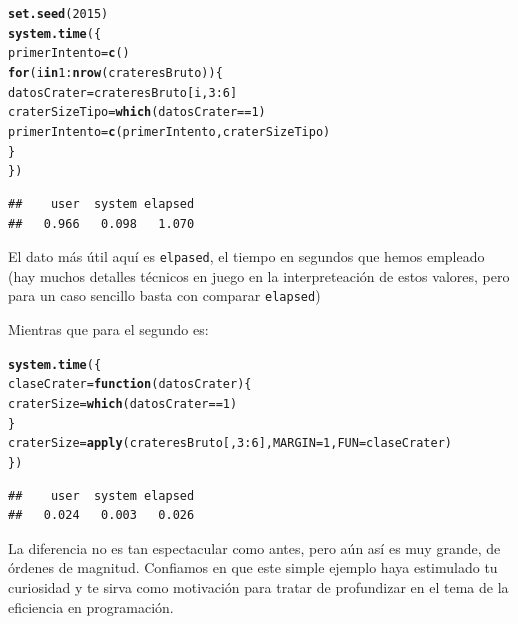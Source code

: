 \documentclass[10pt,a4paper]{article}\usepackage[]{graphicx}\usepackage[]{color}
\makeatletter
\newcommand{\hlnum}[1]{\textcolor[rgb]{0.686,0.059,0.569}{#1}}%
\newcommand{\hlopt}[1]{\textcolor[rgb]{0,0,0}{#1}}%
\newcommand{\hlstd}[1]{\textcolor[rgb]{0.345,0.345,0.345}{#1}}%
\newcommand{\hlkwa}[1]{\textcolor[rgb]{0.161,0.373,0.58}{\textbf{#1}}}%
\newcommand{\hlkwb}[1]{\textcolor[rgb]{0.69,0.353,0.396}{#1}}%
\newcommand{\hlkwc}[1]{\textcolor[rgb]{0.333,0.667,0.333}{#1}}%
\newcommand{\hlkwd}[1]{\textcolor[rgb]{0.737,0.353,0.396}{\textbf{#1}}}%
\newenvironment{kframe}{%
 \def\at@end@of@kframe{}%
 \ifinner\ifhmode%
  \def\at@end@of@kframe{\end{minipage}}%
  \begin{minipage}{\columnwidth}%
 \fi\fi%
 \def\FrameCommand##1{\hskip\@totalleftmargin \hskip-\fboxsep
 \colorbox{shadecolor}{##1}\hskip-\fboxsep
     \hskip-\linewidth \hskip-\@totalleftmargin \hskip\columnwidth}%
 \MakeFramed {\advance\hsize-\width
   \@totalleftmargin\z@ \linewidth\hsize
   \@setminipage}}%
 {\par\unskip\endMakeFramed%
 \at@end@of@kframe}
\newenvironment{knitrout}{}{} %
\makeatother
\begin{document}
\begin{knitrout}
\color{fgcolor}\begin{kframe}
\begin{alltt}
\hlkwd{set.seed}\hlstd{(}\hlnum{2015}\hlstd{)}
\hlkwd{system.time}\hlstd{(\{}
  \hlstd{primerIntento} \hlkwb{=} \hlkwd{c}\hlstd{()}
  \hlkwa{for}\hlstd{(i} \hlkwa{in} \hlnum{1}\hlopt{:}\hlkwd{nrow}\hlstd{(crateresBruto))\{}
    \hlstd{datosCrater} \hlkwb{=} \hlstd{crateresBruto[i,} \hlnum{3}\hlopt{:}\hlnum{6}\hlstd{]}
    \hlstd{craterSizeTipo} \hlkwb{=} \hlkwd{which}\hlstd{(datosCrater} \hlopt{==} \hlnum{1}\hlstd{)}
    \hlstd{primerIntento} \hlkwb{=} \hlkwd{c}\hlstd{(primerIntento, craterSizeTipo)}
  \hlstd{\}}
\hlstd{\})}
\end{alltt}
\begin{verbatim}
##    user  system elapsed 
##   0.966   0.098   1.070
\end{verbatim}
\end{kframe}
\end{knitrout}
El dato más útil aquí es {\tt elpased}, el tiempo en segundos que hemos empleado (hay muchos detalles técnicos en juego en la interpreteación de estos valores, pero para un caso sencillo basta con comparar {\tt elapsed})

Mientras que para el segundo es:
\begin{knitrout}
\color{fgcolor}\begin{kframe}
\begin{alltt}
\hlkwd{system.time}\hlstd{(\{}
  \hlstd{claseCrater} \hlkwb{=} \hlkwa{function}\hlstd{(}\hlkwc{datosCrater}\hlstd{)\{}
    \hlstd{craterSize} \hlkwb{=} \hlkwd{which}\hlstd{(datosCrater} \hlopt{==} \hlnum{1}\hlstd{)}
  \hlstd{\}}
\hlstd{craterSize} \hlkwb{=} \hlkwd{apply}\hlstd{(crateresBruto[,} \hlnum{3}\hlopt{:}\hlnum{6}\hlstd{],} \hlkwc{MARGIN} \hlstd{=} \hlnum{1}\hlstd{,} \hlkwc{FUN} \hlstd{= claseCrater)}
\hlstd{\})}
\end{alltt}
\begin{verbatim}
##    user  system elapsed 
##   0.024   0.003   0.026
\end{verbatim}
\end{kframe}
\end{knitrout}
La diferencia no es tan espectacular como antes, pero aún así es muy grande, de órdenes de magnitud. Confiamos en que este simple ejemplo haya estimulado tu curiosidad y te sirva como motivación para tratar de profundizar en el tema de la eficiencia en programación.
\end{document}
